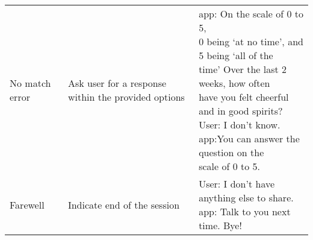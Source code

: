 \begin{table}[t]
\begin{tabular}{p{3cm} p{4cm} p{6cm} }
        \rowcolor[gray]{.95}
        No match error          & Ask user for a response within the provided options       & \makecell[l]{
                                                                                                            \acl{app}: On the scale of 0 to 5, \\
                                                                                                            0 being `at no time', and 5 being `all of the \\
                                                                                                            time' Over the last 2 weeks, how often\\ 
                                                                                                            have you felt cheerful and in good spirits?\\ 
                                                                                                            User: I don't know.\\
                                                                                                            \acl{app}:You can answer the question on the \\
                                                                                                            scale of 0 to 5.
                                                                                                            }
                                                                                                            \\

        Farewell                & Indicate end of the session                               & \makecell[l]{
                                                                                                            User: I don't have anything else to share. \\ 
                                                                                                            \acl{app}: Talk to you next time. Bye!
                                                                                                            }\\
                                                                                                            

        \bottomrule
    \end{tabular}
    \label{tab:diary_mgmt}
\end{table}

